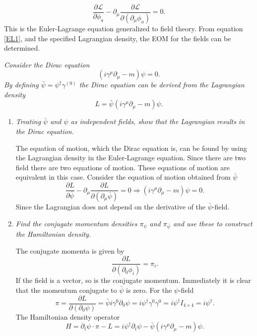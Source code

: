 \begin{equation}
	\frac{\partial \mathcal{L}}{\partial \phi_a}-\partial_\mu\frac{\partial \mathcal{L}}{\partial (\partial_\mu\phi_a)}=0.
	\label{EL1}
\end{equation} 
This is the Euler-Lagrange equation generalized to field theory. From equation \eqref{EL1}, and the specified Lagrangian density, the EOM for the fields can be determined. 
\begin{example}
	\emph{Consider the Dirac equation}
	\begin{equation}
		(i\gamma^{\mu}\partial_\mu-m)\psi=0.
	\end{equation} 
	\emph{By defining $\bar{\psi}=\psi^\dagger\gamma^{(0)}$ the Dirac equation can be derived from the Lagrangian density}
	\begin{equation}
		L=\bar{\psi}(i\gamma^{\mu}\partial_\mu-m)\psi.
	\end{equation} 
	
	\begin{enumerate}
		\item \emph{Treating $\bar{\psi}$ and $\psi$ as independent fields, show that the Lagrangian results in the Dirac equation.}\newline
		
		The equation of motion, which the Dirac equation is, can be found by using the Lagrangian density in the Euler-Lagrange equation. Since there are two field there are two equations of motion. These equations of motion are equivalent in this case. Consider the equation of motion obtained from $\bar{\psi}$
		\begin{equation}
			\frac{\partial L}{\partial \bar{\psi}}-\partial_\mu\frac{\partial L }{\partial (\partial_\mu\bar{\psi})}=0\Rightarrow (i\gamma^{\mu}\partial_\mu-m)\psi=0.
		\end{equation} 
		Since the Lagrangian does not depend on the derivative of the $\bar{\psi}$-field. 
		
		\item \emph{Find the conjugate momentum densities $\pi_{\psi}$ and $\pi_{\bar{\psi}}$ and use these to construct the Hamiltonian density.}\newline
		
		The conjugate momenta is given by
		\begin{equation}
			\frac{\partial L }{\partial (\partial_0\phi_i)}=\pi_{i}.
		\end{equation} 
		If the field is a vector, so is the conjugate momentum. Immediately it is clear that the momentum conjugate to $\bar{\psi}$ is zero. For the $\psi$-field
		\begin{equation}
			\pi=\frac{\partial L }{\partial (\partial_0\psi)}=\bar{\psi}i\gamma^{0}\partial_0\psi=i\psi^\dagger \gamma^{0}\gamma^{0}=i\psi^\dagger I_{4\times 4}=i\psi^\dagger.
		\end{equation} 
		The Hamiltonian density operator
		\begin{equation}
			H=\partial_t\psi\cdot\pi-L=i\psi^\dagger\partial_t\psi -\bar{\psi}(i\gamma^{\mu}\partial_\mu-m)\psi.
		\end{equation} 
	\end{enumerate}
\end{example}
